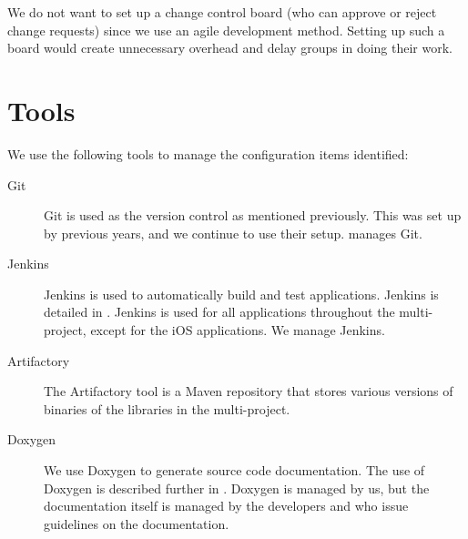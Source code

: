 We do not want to set up a change control board\parencite[p. 6-9]{swebok} (who can approve or reject change requests) since we use an agile development method. Setting up such a board would create unnecessary overhead and delay groups in doing their work.

\section{Tools}\label{sec:SCM_tools}
We use the following tools to manage the configuration items identified:

\begin{description}
  \item[Git] Git is used as the version control as mentioned previously. This was set up by previous years, and we continue to use their setup.  manages Git.
  \item[Jenkins] Jenkins is used to automatically build and test applications. Jenkins is detailed in . Jenkins is used for all applications throughout the multi-project, except for the iOS applications. We manage Jenkins.
  \item[Artifactory] The Artifactory tool is a Maven repository that stores various versions of binaries of the libraries in the multi-project. 
  \item[Doxygen] We use Doxygen to generate source code documentation. The use of Doxygen is described further in . Doxygen is managed by us, but the documentation itself is managed by the developers and  who issue guidelines on the documentation.
\end{description}